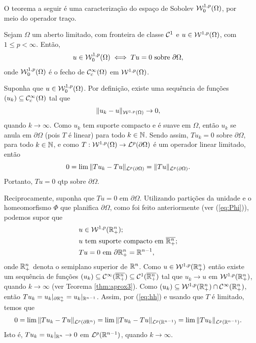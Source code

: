 O teorema a seguir é uma caracterização do espaço de Sobolev $\mathcal{W}^{1,p}_0(\Omega)$, por meio do operador traço.

\begin{tbox} \label{thm:traco-2}
    Sejam $\Omega$ um aberto limitado, com fronteira de classe $\mathcal{C}^1$ e $u \in \mathcal{W}^{1,p}(\Omega)$, com $1 \leqslant p < \infty$. Então,
    \[
        u \in \mathcal{W}_0^{1,p}(\Omega) \iff Tu = 0 \text{ sobre } \partial \Omega,
    \]
    onde $\mathcal{W}_0^{1,p}(\Omega)$ é o fecho de $\mathcal{C}^{\infty}_c(\Omega)$ em $\mathcal{W}^{1,p}(\Omega)$.
\end{tbox}
\begin{prf}
    Suponha que $u \in \mathcal{W}_0^{1,p}(\Omega)$. Por definição, existe uma sequência de funções $(u_k) \subseteq \mathcal{C}^{\infty}_c(\Omega)$ tal que
    \[
        \Vert u_k - u \Vert_{\mathcal{W}^{1,p}(\Omega)} \to 0,
    \]
    quando $k \to \infty$. Como $u_k$ tem suporte compacto e é suave em $\Omega$, então $u_k$ se anula em $\partial \Omega$ (pois $T$ é linear) para todo $k \in \mathbb{N}$. Sendo assim, $Tu_k = 0$ sobre $\partial\Omega$, para todo $k \in \mathbb{N}$, e como $T : \mathcal{W}^{1,p}(\Omega) \to \mathcal{L}^p(\partial \Omega)$ é um operador linear limitado, então
    \[
        0 = \lim \Vert Tu_k - Tu \Vert_{\mathcal{L}^p(\partial \Omega)} = \Vert Tu \Vert_{\mathcal{L}^p(\partial \Omega)}.
    \]
    Portanto, $Tu =0$ qtp sobre $\partial \Omega$.

    Reciprocamente, suponha que $Tu = 0$ em $\partial \Omega$. Utilizando partições da unidade e o homeomorfismo $\Phi$ que planifica $\partial \Omega$, como foi feito anteriormente (ver (\ref{eq:Phi})), podemos supor que
    \begin{equation} \label{eq:hh}
        \begin{aligned}
            &u \in \mathcal{W}^{1,p}(\mathbb{R}^n_+);\\
            &u \text{ tem suporte compacto em } \overline{\mathbb{R}^n_+};\\
            &Tu = 0 \text{ em } \partial \mathbb{R}^n_+ = \mathbb{R}^{n-1},
        \end{aligned}
    \end{equation}
    onde $\mathbb{R}^n_+$ denota o semiplano superior de $\mathbb{R}^n$.
    Como $u \in \mathcal{W}^{1,p}(\mathbb{R}^n_+)$ então existe um sequência de funções $(u_k) \subseteq \mathcal{C}^{\infty}(\overline{\mathbb{R}^n_+}) \subseteq \mathcal{C}^1(\overline{\mathbb{R}^n_+})$ tal que $u_k \to u$ em $\mathcal{W}^{1,p}(\mathbb{R}^n_+)$, quando $k \to \infty$ (ver Teorema \ref{thm:aprox3}). Como $(u_k) \subseteq \mathcal{W}^{1,p}(\mathbb{R}^n_+) \cap \mathcal{C}^\infty(\mathbb{R}^n_+)$, então $T u_k = u_k |_{\partial \mathbb{R}^n_+} = u_k |_{\mathbb{R}^{n-1}}$.
    Assim, por (\ref{eq:hh}) e usando que $T$ é limitado, temos que
    \begin{equation} \label{eq:nanna}
        0 = \lim \Vert Tu_k - Tu \Vert_{\mathcal{L}^p(\partial \mathbb{R}^n)} = \lim \Vert Tu_k - Tu \Vert_{\mathcal{L}^p(\mathbb{R}^{n-1})} = \lim \Vert Tu_k \Vert_{\mathcal{L}^p(\mathbb{R}^{n-1})}.
    \end{equation}
    Isto é, $T u_k = u_k |_{\mathbb{R}^n} \to 0$ em $\mathcal{L}^p(\mathbb{R}^{n-1})$, quando $k \to \infty$.


\end{prf}

